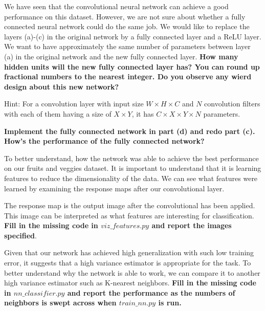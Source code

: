\documentclass[preview]{standalone}
\begin{document}
\begin{Parts}
\Part We have seen that the convolutional neural network can achieve a good performance on this dataset. However, we are not sure about whether a fully connected neural network could do the same job. We would like to replace the layers (a)-(c) in the original network by a fully connected layer and a ReLU layer. We want to have approximately the same number of parameters between layer (a) in the original network and the new fully connected layer. \textbf{How many hidden units will the new fully connected layer has? You can round up fractional numbers to the nearest integer. Do you observe any wierd design about this new network?}

Hint: For a convolution layer with input size $W\times H \times C$ and $N$ convolution filters with each of them having a size of $X \times Y$, it has $C \times X \times Y \times N$ parameters.



\Part \textbf{Implement the fully connected network in part (d) and redo part (c). How's the performance of the fully connected network? }





\Part To better understand, how the network was able to achieve the best performance on our fruits and veggies dataset. It is important to understand that it is learning features to reduce the dimensionality of the data. We can see what features were learned by examining the response maps after our convolutional layer.

The response map is the output image after the convolutional has been applied. This image can be interpreted as what features are interesting for classification. {\bf Fill in the missing code in $viz\_features.py$ and report the images specified}.




\Part Given that our network has achieved high generalization with such low training error, it suggests that a high variance estimator is appropriate for the task. To better understand why the network is able to work, we can compare it to another high variance estimator such as K-nearest neighbors. {\bf Fill in the missing code in $nn\_classifier.py$ and report the performance as the numbers of neighbors is swept across when $train\_nn.py$ is run.}







\end{Parts}
\end{document}
